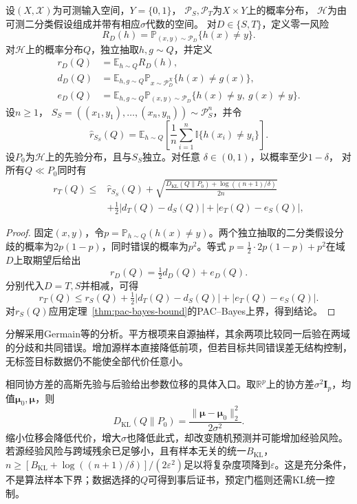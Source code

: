 \begin{theorem}[参数分布的跨域期望风险界]
\label{thm:transfer-pac-bayes}
设$(X,\mathcal X)$为可测输入空间，$Y=\{0,1\}$，
$\mathcal P_S,\mathcal P_T$为$X\times Y$上的概率分布，
$\mathcal H$为由可测二分类假设组成并带有相应$\sigma$代数的空间。
对$D\in\{S,T\}$，定义零一风险
\[
 R_D(h)=\mathbb P_{(x,y)\sim\mathcal P_D}\{h(x)\neq y\}.
\]
对$\mathcal H$上的概率分布$Q$，独立抽取$h,g\sim Q$，并定义
\[
 \begin{aligned}
 r_D(Q)&=\mathbb E_{h\sim Q}R_D(h),\\
 d_D(Q)&=\mathbb E_{h,g\sim Q}
 \mathbb P_{x\sim\mathcal P_D^X}\{h(x)\neq g(x)\},\\
 e_D(Q)&=\mathbb E_{h,g\sim Q}
 \mathbb P_{(x,y)\sim\mathcal P_D}
 \{h(x)\neq y,\ g(x)\neq y\}.
 \end{aligned}
\]
设$n\geq1$，
$S_S=((x_1,y_1),\ldots,(x_n,y_n))\sim\mathcal P_S^n$，并令
\[
 \widehat r_{S_S}(Q)=\mathbb E_{h\sim Q}
 \left[\frac1n\sum_{i=1}^n\mathbb I\{h(x_i)\neq y_i\}\right].
\]
设$P_0$为$\mathcal H$上的先验分布，且与$S_S$独立。对任意
$\delta\in(0,1)$，以概率至少$1-\delta$，
对所有$Q\ll P_0$同时有
\begin{equation}
 \begin{aligned}
 r_T(Q)\leq{}&\widehat r_{S_S}(Q)
 +\sqrt{\frac{D_{\mathrm{KL}}(Q\|P_0)+\log((n+1)/\delta)}{2n}}\\
 &+\tfrac12|d_T(Q)-d_S(Q)|+|e_T(Q)-e_S(Q)|,
 \end{aligned}
 \label{eq:transfer-pac-bayes}
\end{equation}
\end{theorem}
\begin{proof}
固定$(x,y)$，令$p=\mathbb P_{h\sim Q}(h(x)\neq y)$。两个独立抽取的二分类假设分歧的概率为$2p(1-p)$，同时错误的概率为$p^2$。等式
$p=\tfrac12\cdot2p(1-p)+p^2$在域$D$上取期望后给出
\[
 r_D(Q)=\tfrac12d_D(Q)+e_D(Q).
\]
分别代入$D=T,S$并相减，可得
\[
 r_T(Q)\leq r_S(Q)+\tfrac12|d_T(Q)-d_S(Q)|+|e_T(Q)-e_S(Q)|.
\]
对$r_S(Q)$应用定理~\ref{thm:pac-bayes-bound}的PAC--Bayes上界，得到结论。
\end{proof}

分解采用Germain等的分析。平方根项来自源抽样，其余两项比较同一后验在两域的分歧和共同错误。增加源样本直接降低前项，但若目标共同错误差无结构控制，无标签目标数据仍不能使全部代价任意小。

相同协方差的高斯先验与后验给出参数位移的具体入口。取$\mathbb R^p$上的协方差$\sigma^2\bm I_p$，均值$\bm\mu_0,\bm\mu$，则
\[
 D_{\mathrm{KL}}(Q\|P_0)=\frac{\|\bm\mu-\bm\mu_0\|_2^2}{2\sigma^2}.
\]
缩小位移会降低代价，增大$\sigma$也降低此式，却改变随机预测并可能增加经验风险。若源经验风险与跨域残余已足够小，且有样本无关的统一$B_{\mathrm{KL}}$，$n\geq[B_{\mathrm{KL}}+\log((n+1)/\delta)]/(2\varepsilon^2)$足以将复杂度项降到$\varepsilon$。这是充分条件，不是算法样本下界；数据选择的$Q$可得到事后证书，预定门槛则还需KL统一控制。

